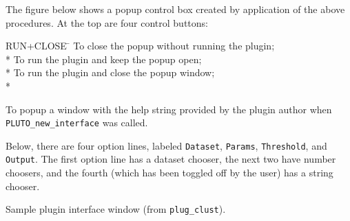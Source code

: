 The figure below shows a popup control box created by application
of the above procedures.  At the top are four control buttons:
\begin{tabbing}
 \blob RUN+CLOSE \= \kill
%
      \> To close the popup without running the plugin; \\*
  \> To run the plugin and keep the popup open; \\*
 \> To run the plugin and close the popup window; \\*
      \> \parbox[t]{5in}{To popup a window with the help string provided
                  by the plugin author when {\tt PLUTO\_new\_interface}
                  was called.}
\end{tabbing}
Below, there are four option lines, labeled
{\tt Dataset}, {\tt Params}, {\tt Threshold}, and {\tt Output}.
The first option line has a dataset chooser, the next two have
number choosers, and the fourth (which has been toggled off by the user)
has a string chooser.

\vspace{3in}\goodbreak\vspace{-2.9in}

\begin{samepage}
\centerline{\epsfxsize=6in}\vspace{1ex}

\centerline{Sample plugin interface window (from {\tt plug\_clust}).}\vspace{2ex}
\end{samepage}

